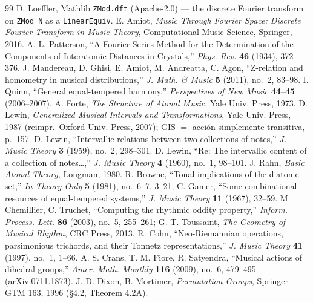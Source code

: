 \documentclass[11pt]{article}
\newcommand{\lean}[1]{\texttt{#1}}
\begin{document}
\begin{thebibliography}{99}
 D. Loeffler, Mathlib \lean{ZMod.dft} (Apache-2.0) --- the discrete Fourier
  transform on \lean{ZMod N} as a \lean{LinearEquiv}.
 E. Amiot, \emph{Music Through Fourier Space: Discrete Fourier Transform in Music
  Theory}, Computational Music Science, Springer, 2016.
 A. L. Patterson, ``A Fourier Series Method for the Determination of the
  Components of Interatomic Distances in Crystals,'' \emph{Phys. Rev.} \textbf{46} (1934),
  372--376.
 J. Mandereau, D. Ghisi, E. Amiot, M. Andreatta, C. Agon, ``Z-relation and
  homometry in musical distributions,'' \emph{J. Math. \& Music} \textbf{5} (2011), no.~2,
  83--98.
 I. Quinn, ``General equal-tempered harmony,'' \emph{Perspectives of New Music}
  \textbf{44}--\textbf{45} (2006--2007).
 A. Forte, \emph{The Structure of Atonal Music}, Yale Univ. Press, 1973.
 D. Lewin, \emph{Generalized Musical Intervals and Transformations}, Yale Univ.
  Press, 1987 (reimpr.\ Oxford Univ. Press, 2007); GIS $=$ acción simplemente transitiva, p.~157.
 D. Lewin, ``Intervallic relations between two collections of notes,''
  \emph{J. Music Theory} \textbf{3} (1959), no.~2, 298--301.
 D. Lewin, ``Re: The intervallic content of a collection of notes\dots,''
  \emph{J. Music Theory} \textbf{4} (1960), no.~1, 98--101.
 J. Rahn, \emph{Basic Atonal Theory}, Longman, 1980.
 R. Browne, ``Tonal implications of the diatonic set,'' \emph{In Theory Only}
  \textbf{5} (1981), no.~6--7, 3--21; C. Gamer, ``Some combinational resources of equal-tempered
  systems,'' \emph{J. Music Theory} \textbf{11} (1967), 32--59.
 M. Chemillier, C. Truchet, ``Computing the rhythmic oddity property,''
  \emph{Inform. Process. Lett.} \textbf{86} (2003), no.~5, 255--261; G. T. Toussaint, \emph{The
  Geometry of Musical Rhythm}, CRC Press, 2013.
 R. Cohn, ``Neo-Riemannian operations, parsimonious trichords, and their Tonnetz
  representations,'' \emph{J. Music Theory} \textbf{41} (1997), no.~1, 1--66.
 A. S. Crans, T. M. Fiore, R. Satyendra, ``Musical actions of dihedral groups,''
  \emph{Amer. Math. Monthly} \textbf{116} (2009), no.~6, 479--495 (arXiv:0711.1873).
 J. D. Dixon, B. Mortimer, \emph{Permutation Groups}, Springer GTM 163, 1996
  (\S4.2, Theorem 4.2A).

\end{thebibliography}
\end{document}
